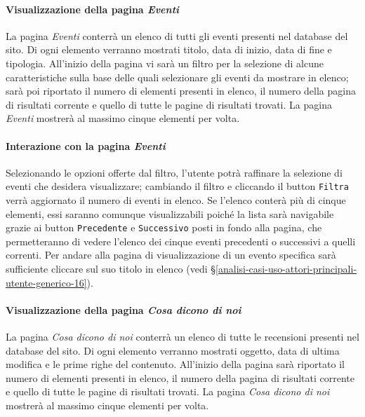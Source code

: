 \paragraph{Visualizzazione della pagina \textit{Eventi}}
\label{analisi-casi-uso-attori-principali-utente-generico-6}
La pagina \textit{Eventi} conterrà un elenco di tutti gli eventi presenti nel database del sito. Di ogni elemento verranno mostrati titolo, data di inizio, data di fine e tipologia. All'inizio della pagina vi sarà un filtro per la selezione di alcune caratteristiche sulla base delle quali selezionare gli eventi da mostrare in elenco; sarà poi riportato il numero di elementi presenti in elenco, il numero della pagina di risultati corrente e quello di tutte le pagine di risultati trovati. La pagina \textit{Eventi} mostrerà al massimo cinque elementi per volta.


\paragraph{Interazione con la pagina \textit{Eventi}}
\label{analisi-casi-uso-attori-principali-utente-generico-7}
Selezionando le opzioni offerte dal filtro, l'utente potrà raffinare la selezione di eventi che desidera visualizzare; cambiando il filtro e cliccando il button \texttt{Filtra} verrà aggiornato il numero di eventi in elenco. Se l'elenco conterà più di cinque elementi, essi saranno comunque visualizzabili poiché la lista sarà navigabile grazie ai button \texttt{Precedente} e \texttt{Successivo} posti in fondo alla pagina, che permetteranno di vedere l'elenco dei cinque eventi precedenti o successivi a quelli correnti. Per andare alla pagina di visualizzazione di un evento specifica sarà sufficiente cliccare sul suo titolo in elenco (vedi §\ref{analisi-casi-uso-attori-principali-utente-generico-16}).


\paragraph{Visualizzazione della pagina \textit{Cosa dicono di noi}}
\label{analisi-casi-uso-attori-principali-utente-generico-8}
La pagina \textit{Cosa dicono di noi} conterrà un elenco di tutte le recensioni presenti nel database del sito. Di ogni elemento verranno mostrati oggetto, data di ultima modifica e le prime righe del contenuto. All'inizio della pagina sarà riportato il numero di elementi presenti in elenco, il numero della pagina di risultati corrente e quello di tutte le pagine di risultati trovati. La pagina \textit{Cosa dicono di noi} mostrerà al massimo cinque elementi per volta.


